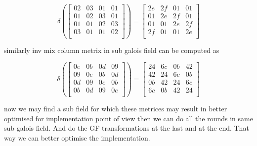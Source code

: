 \documentclass[10pt, conference, compsocconf]{IEEEtran}
\begin{document}
\begin{equation}
\delta \left(\left[ \begin{array}{cccccccc}
02 & 03 & 01 & 01\\
01 & 02 & 03 & 01\\
01 & 01 & 02 & 03\\
03 & 01 & 01 & 02\\
 \end{array} \right]\right) = \left[ \begin{array}{cccccccc}
2e & 2f & 01 & 01\\
01 & 2e & 2f & 01\\
01 & 01 & 2e & 2f\\
2f & 01 & 01 & 2e\\
 \end{array} \right]
\end{equation}


similarly inv mix column metrix in sub galois field can be computed as


\begin{equation}
\delta \left(\left[ \begin{array}{cccccccc}
0e & 0b & 0d & 09\\
09 & 0e & 0b & 0d\\
0d & 09 & 0e & 0b\\
0b & 0d & 09 & 0e\\
 \end{array} \right]\right) = \left[ \begin{array}{cccccccc}
24 & 6c & 0b & 42\\
42 & 24 & 6c & 0b\\
0b & 42 & 24 & 6c\\
6c & 0b & 42 & 24\\
 \end{array} \right]
\end{equation}

now we may find a sub field for which these metrices may result in better optimised for implementation point of view then we can do all the rounds in same sub galois field. And do the GF transformations at the last and at the end. That way we can better optimise the implementation.



\end{document}
